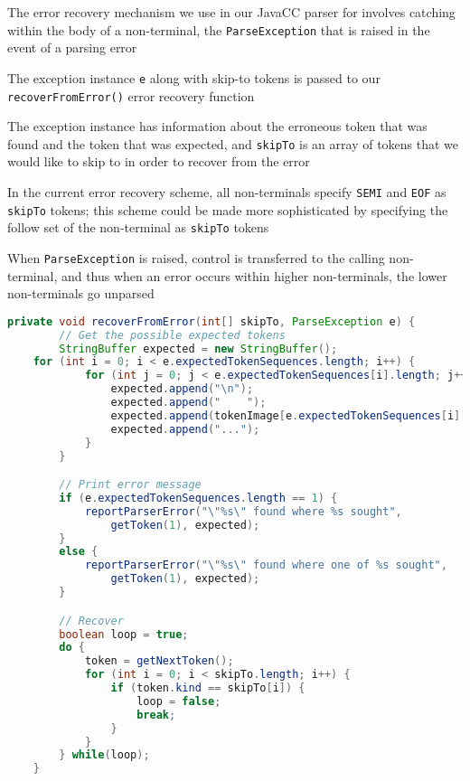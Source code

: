 \documentclass[8pt,a4paper,compress]{beamer}
\begin{document}
\begin{frame}[fragile]
\pause

The error recovery mechanism we use in our JavaCC parser for \jmm involves catching within the body of a non-terminal, the \lstinline{ParseException} that is raised in the event of a parsing error

\pause
\bigskip

The exception instance \lstinline{e} along with skip-to tokens is passed to our \lstinline{recoverFromError()} error recovery function

\pause
\bigskip

The exception instance has information about the erroneous token that was found and the token that was expected, and \lstinline{skipTo} is an array of tokens that we would like to skip to in order to recover from the error

\pause
\bigskip

In the current error recovery scheme, all non-terminals specify \lstinline{SEMI} and \lstinline{EOF} as \lstinline{skipTo} tokens; this scheme could be made more sophisticated by specifying the follow set of the non-terminal as \lstinline{skipTo} tokens

\pause
\bigskip

When \lstinline{ParseException} is raised, control is transferred to the calling non-terminal, and thus when an error occurs within higher non-terminals, the lower non-terminals go unparsed
\end{frame}

\begin{frame}[fragile]
\pause

\begin{lstlisting}[language=Java]
    private void recoverFromError(int[] skipTo, ParseException e) {
        // Get the possible expected tokens
        StringBuffer expected = new StringBuffer();
	for (int i = 0; i < e.expectedTokenSequences.length; i++) {
            for (int j = 0; j < e.expectedTokenSequences[i].length; j++) {
                expected.append("\n");
                expected.append("    ");
                expected.append(tokenImage[e.expectedTokenSequences[i][j]]);
                expected.append("...");
            }
        }

        // Print error message
        if (e.expectedTokenSequences.length == 1) {
            reportParserError("\"%s\" found where %s sought",                   
                getToken(1), expected);
        }
        else {
            reportParserError("\"%s\" found where one of %s sought",            
                getToken(1), expected);
        }

        // Recover
        boolean loop = true;
        do {
            token = getNextToken();
            for (int i = 0; i < skipTo.length; i++) {
                if (token.kind == skipTo[i]) {
                    loop = false;
                    break;
                }
            }
        } while(loop);
    }
\end{lstlisting}
\end{frame}
\end{document}
